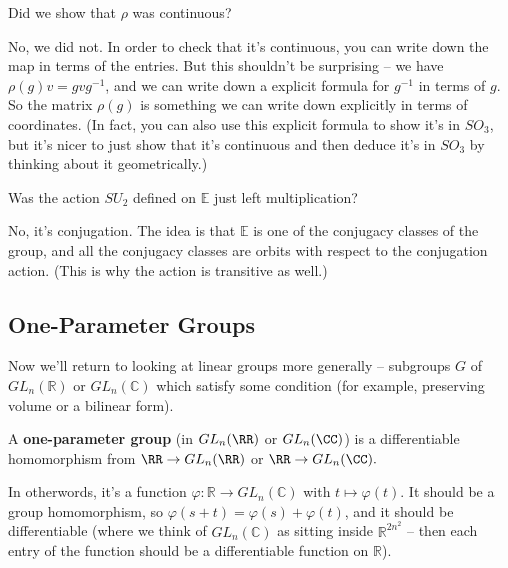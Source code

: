 \begin{question}
Did we show that $\rho$ was continuous?
\end{question}

\begin{ans}
No, we did not. In order to check that it's continuous, you can write down the map in terms of the entries. But this shouldn't be surprising -- we have $\rho(g)v = gvg^{-1}$, and we can write down a explicit formula for $g^{-1}$ in terms of $g$. So the matrix $\rho(g)$ is something we can write down explicitly in terms of coordinates. (In fact, you can also use this explicit formula to show it's in $SO_3$, but it's nicer to just show that it's continuous and then deduce it's in $SO_3$ by thinking about it geometrically.)
\end{ans}

\begin{question}
Was the action $SU_2$ defined on $\mathbb{E}$ just left multiplication?
\end{question}

\begin{ans}
No, it's conjugation. The idea is that $\mathbb{E}$ is one of the conjugacy classes of the group, and all the conjugacy classes are orbits with respect to the conjugation action. (This is why the action is transitive as well.)
\end{ans}


\subsection{One-Parameter Groups}

Now we'll return to looking at linear groups more generally -- subgroups $G$ of $GL_n(\mathbb{R})$ or $GL_n(\mathbb{C})$ which satisfy some condition (for example, preserving volume or a bilinear form). 

\begin{definition}
A \textbf{one-parameter group} (in $GL_n(\RR)$ or $GL_n(\CC)$) is a differentiable homomorphism from $\RR \to GL_n(\RR)$ or $\RR \to GL_n(\CC).$
\end{definition}

In otherwords, it's a function $\varphi : \mathbb{R} \to GL_n(\mathbb{C})$ with $t \mapsto \varphi(t)$. It should be a group homomorphism, so $\varphi(s + t) = \varphi(s) + \varphi(t)$, and it should be differentiable (where we think of $GL_n(\mathbb{C})$ as sitting inside $\mathbb{R}^{2n^2}$ -- then each entry of the function should be a differentiable function on $\mathbb{R}$). 

